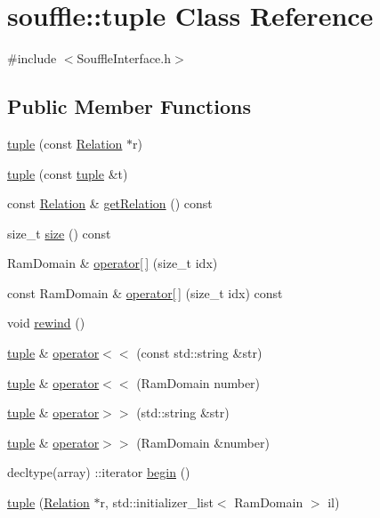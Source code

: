 \hypertarget{classsouffle_1_1tuple}{}\section{souffle\+:\+:tuple Class Reference}
\label{classsouffle_1_1tuple}


{\ttfamily \#include $<$Souffle\+Interface.\+h$>$}

\subsection*{Public Member Functions}
\begin{DoxyCompactItemize}
\item 
\hyperlink{classsouffle_1_1tuple_a4a850c0890de15cdd2eba5c5d8f90bb6}{tuple} (const \hyperlink{classsouffle_1_1_relation}{Relation} $\ast$r)
\item 
\hyperlink{classsouffle_1_1tuple_ab6821ad47ca64003a4931731a7ceddf2}{tuple} (const \hyperlink{classsouffle_1_1tuple}{tuple} \&t)
\item 
const \hyperlink{classsouffle_1_1_relation}{Relation} \& \hyperlink{classsouffle_1_1tuple_a0ab9c3b37d368d4372e7e27fdbf20ee6}{get\+Relation} () const
\item 
size\+\_\+t \hyperlink{classsouffle_1_1tuple_ac1e884fd470e139ca8223af684f379bc}{size} () const
\item 
Ram\+Domain \& \hyperlink{classsouffle_1_1tuple_aa7ff0d718dbabaa6eab90a1b7615210a}{operator\mbox{[}$\,$\mbox{]}} (size\+\_\+t idx)
\item 
const Ram\+Domain \& \hyperlink{classsouffle_1_1tuple_aab1b4561489c7cf69de57d90487119e6}{operator\mbox{[}$\,$\mbox{]}} (size\+\_\+t idx) const
\item 
void \hyperlink{classsouffle_1_1tuple_a178e16d502713964b96c2346592255a1}{rewind} ()
\item 
\hyperlink{classsouffle_1_1tuple}{tuple} \& \hyperlink{classsouffle_1_1tuple_a043d1084b36f2808d79d5e8aca86d4b8}{operator$<$$<$} (const std\+::string \&str)
\item 
\hyperlink{classsouffle_1_1tuple}{tuple} \& \hyperlink{classsouffle_1_1tuple_a52d4b510d904ed1ea7f45d08771cdfbb}{operator$<$$<$} (Ram\+Domain number)
\item 
\hyperlink{classsouffle_1_1tuple}{tuple} \& \hyperlink{classsouffle_1_1tuple_a3d1131d74b8b61cf8e445a155adaa046}{operator$>$$>$} (std\+::string \&str)
\item 
\hyperlink{classsouffle_1_1tuple}{tuple} \& \hyperlink{classsouffle_1_1tuple_a8a244b8c41ed48f9bb88db305d4b8785}{operator$>$$>$} (Ram\+Domain \&number)
\item 
decltype(array) \+::iterator \hyperlink{classsouffle_1_1tuple_a4b74ce0412f8d5aa1ea8614be5ad8579}{begin} ()
\item 
\hyperlink{classsouffle_1_1tuple_af61ac98bf7f0e2171ba91e4d394884df}{tuple} (\hyperlink{classsouffle_1_1_relation}{Relation} $\ast$r, std\+::initializer\+\_\+list$<$ Ram\+Domain $>$ il)
\end{DoxyCompactItemize}
